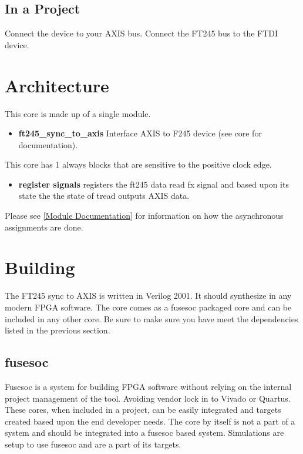 

\subsection{In a Project}
\par
Connect the device to your AXIS bus. Connect the FT245 bus to the FTDI device.

\section{Architecture}
\par
This core is made up of a single module.
\begin{itemize}
  \item \textbf{ft245\_sync\_to\_axis} Interface AXIS to F245 device (see core for documentation).
\end{itemize}

\par
This core has 1 always blocks that are sensitive to the positive clock edge.

\begin{itemize}
\item \textbf{register signals} registers the ft245 data read fx signal and based upon its state the the state of tread outputs AXIS data.
\end{itemize}

Please see \ref{Module Documentation} for information on how the asynchronous assignments are done.

\section{Building}

\par
The FT245 sync to AXIS is written in Verilog 2001. It should synthesize in any modern FPGA software. The core comes as a fusesoc packaged core and can be
included in any other core. Be sure to make sure you have meet the dependencies listed in the previous section.

\subsection{fusesoc}
\par
Fusesoc is a system for building FPGA software without relying on the internal project management of the tool. Avoiding vendor lock in to Vivado or Quartus.
These cores, when included in a project, can be easily integrated and targets created based upon the end developer needs. The core by itself is not a part of
a system and should be integrated into a fusesoc based system. Simulations are setup to use fusesoc and are a part of its targets.

